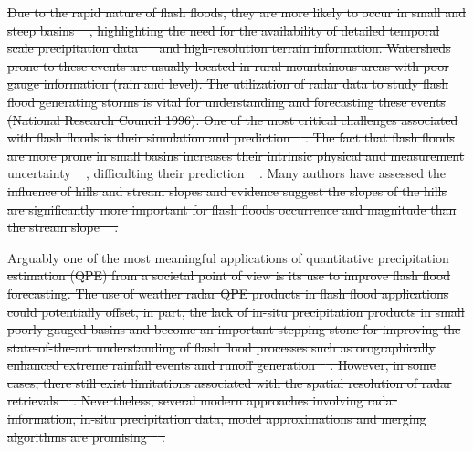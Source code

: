 \documentclass[hess, manuscript]{copernicus} %
\providecommand{\DIFdel}[1]{{\protect\color{red}\sout{#1}}}                      %
\begin{document}
\DIFdel{Due to the rapid nature of flash floods, they are more likely to occur in small and steep basins \mbox{%
\citep{Younis2008}}\hspace{0pt}%
, highlighting the need for the availability of detailed temporal scale precipitation data \mbox{%
\citep{Norbiato2008} }\hspace{0pt}%
and high-resolution terrain information. Watersheds prone to these events are usually located in rural mountainous areas with poor gauge information (rain and level). The utilization of radar data to study flash flood generating storms is vital for understanding and forecasting these events  (National Research Council 1996).  One of the most critical challenges associated with flash floods is their simulation and prediction \mbox{%
\citep{Yamanaka2017,Borga2011, Marra2017}}\hspace{0pt}%
. The fact that flash floods are more prone in small basins increases their intrinsic physical and measurement uncertainty \mbox{%
\citep{Wagener2007}}\hspace{0pt}%
,  difficulting their prediction \mbox{%
\citep{Hardy2016,Ruiz-Villanueva2013}}\hspace{0pt}%
.  Many authors have assessed the influence of hills and stream slopes and evidence suggest the slopes of the hills are significantly more important for flash floods occurrence and magnitude than the stream slope \mbox{%
\citep{Doswell2001, Salek2006, Roux2011, Yatheendradas2008}}\hspace{0pt}%
.}%

\DIFdel{Arguably one of the most meaningful applications of quantitative precipitation estimation (QPE)  from a societal point of view is its use to improve flash flood forecasting. The use of weather radar QPE products in flash flood applications could potentially offset, in part, the lack of in-situ precipitation products in small poorly gauged basins and become an important stepping stone for improving the state-of-the-art understanding of flash flood processes such as orographically enhanced extreme rainfall events and runoff generation \mbox{%
\citep{Creutin2003}}\hspace{0pt}%
.  However, in some cases, there still exist limitations associated with the spatial resolution of radar retrievals \mbox{%
\citep{Salek2006, Hardy2016}}\hspace{0pt}%
. Nevertheless, several modern approaches involving radar information, in-situ precipitation data, model approximations and merging algorithms are promising \mbox{%
\citep{Braud2016}}\hspace{0pt}%
.}%
\end{document}
